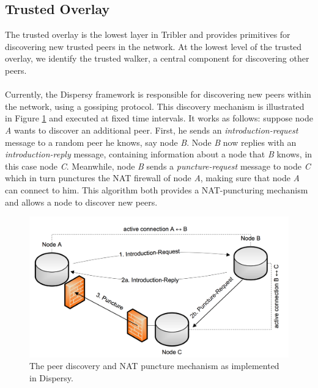 \subsection{Trusted Overlay}
The trusted overlay is the lowest layer in Tribler and provides primitives for discovering new trusted peers in the network. At the lowest level of the trusted overlay, we identify the trusted walker, a central component for discovering other peers.\\\\
Currently, the Dispersy framework is responsible for discovering new peers within the network, using a gossiping protocol\cite{zeilemaker2013dispersy}. This discovery mechanism is illustrated in Figure \ref{fig:dispersy-discover} and executed at fixed time intervals. It works as follows: suppose node \emph{A} wants to discover an additional peer. First, he sends an \emph{introduction-request} message to a random peer he knows, say node \emph{B}. Node \emph{B} now replies with an \emph{introduction-reply} message, containing information about a node that \emph{B} knows, in this case node \emph{C}. Meanwhile, node \emph{B} sends a \emph{puncture-request} message to node \emph{C} which in turn punctures the NAT firewall of node \emph{A}, making sure that node \emph{A} can connect to him. This algorithm both provides a NAT-puncturing mechanism and allows a node to discover new peers.\\

\begin{figure}[h!]
	\centering
	\includegraphics[width=0.7\columnwidth]{images/architecture/dispersy_discover}
	\caption{The peer discovery and NAT puncture mechanism as implemented in Dispersy.}
	\label{fig:dispersy-discover}
\end{figure}

